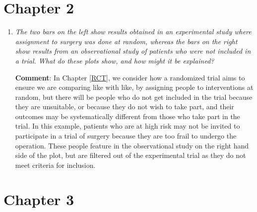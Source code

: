 \documentclass{krantz}
\begin{document}
\hypertarget{chapter-2}{%
\section{Chapter 2}\label{chapter-2}}

\begin{enumerate}
\def\labelenumi{\arabic{enumi}.}
\setcounter{enumi}{1}
\item
  \emph{The two bars on the left show results obtained in an experimental study where assignment to surgery was done at random, whereas the bars on the right show results from an observational study of patients who were not included in a trial. What do these plots show, and how might it be explained?}

  \textbf{Comment}: In Chapter \ref{RCT}, we consider how a randomized trial aims to ensure we are comparing like with like, by assigning people to interventions at random, but there will be people who do not get included in the trial because they are unsuitable, or because they do not wish to take part, and their outcomes may be systematically different from those who take part in the trial. In this example, patients who are at high risk may not be invited to participate in a trial of surgery because they are too frail to undergo the operation. These people feature in the observational study on the right hand side of the plot, but are filtered out of the experimental trial as they do not meet criteria for inclusion.
\end{enumerate}

\hypertarget{chapter-3}{%
\section{Chapter 3}\label{chapter-3}}
\end{document}
